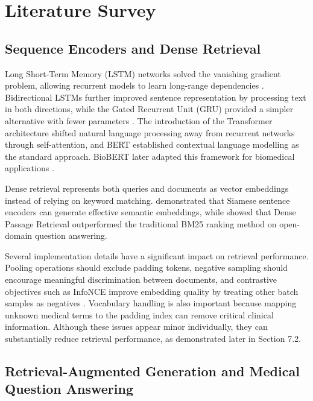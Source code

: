 \section{Literature Survey}
\label{sec:Relatedwork}

\subsection{Sequence Encoders and Dense Retrieval}

Long Short-Term Memory (LSTM) networks solved the vanishing gradient problem, allowing recurrent models to learn long-range dependencies \citep{hochreiter1997}. Bidirectional LSTMs further improved sentence representation by processing text in both directions, while the Gated Recurrent Unit (GRU) provided a simpler alternative with fewer parameters \citep{cho2014}. The introduction of the Transformer architecture \citep{vaswani2017} shifted natural language processing away from recurrent networks through self-attention, and BERT \citep{devlin2019} established contextual language modelling as the standard approach. BioBERT later adapted this framework for biomedical applications \citep{lee2020}.

Dense retrieval represents both queries and documents as vector embeddings instead of relying on keyword matching. \citet{reimers2019} demonstrated that Siamese sentence encoders can generate effective semantic embeddings, while \citet{karpukhin2020} showed that Dense Passage Retrieval outperformed the traditional BM25 ranking method \citep{robertson2009} on open-domain question answering.

Several implementation details have a significant impact on retrieval performance. Pooling operations should exclude padding tokens, negative sampling should encourage meaningful discrimination between documents, and contrastive objectives such as InfoNCE improve embedding quality by treating other batch samples as negatives \citep{oord2018}. Vocabulary handling is also important because mapping unknown medical terms to the padding index can remove critical clinical information. Although these issues appear minor individually, they can substantially reduce retrieval performance, as demonstrated later in Section 7.2.

\subsection{Retrieval-Augmented Generation and Medical Question Answering}

